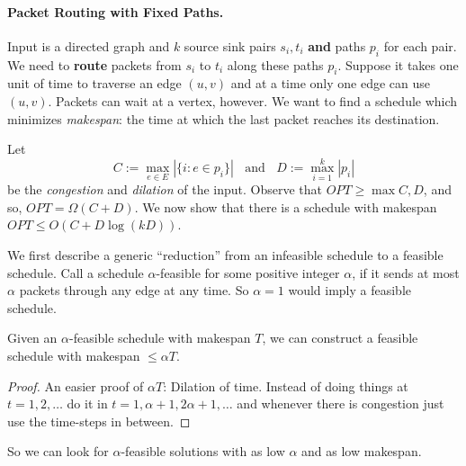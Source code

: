 \documentclass[11pt]{article}
\begin{document}
	\paragraph{Packet Routing with Fixed Paths.} 
	
	Input is a directed graph and $k$ source sink pairs $s_i,t_i$ {\bf and} paths $p_i$ for each pair. 
	We need to {\bf route} packets from $s_i$ to $t_i$ along these paths $p_i$. Suppose it takes one unit of time to traverse an edge $(u,v)$ and at a time only one edge can use $(u,v)$.
	Packets can wait at a vertex, however.
	We want to find a schedule which minimizes {\em makespan}: the time at which the last packet reaches its destination.
	
	Let 
	\[
	C := \max_{e\in E} |\{i: e\in p_i\}|~~~~ \textrm{and}~~~~ D := \max_{i=1}^k |p_i|
	\]
	be the {\em congestion} and {\em dilation} of the input. Observe that $OPT \geq \max{C,D}$, and so, $OPT = \Omega(C+D)$.
	We now show that there is a schedule with makespan $OPT \leq O(C + D\log(kD))$.
	
	
	We first describe a generic ``reduction'' from an infeasible schedule to a feasible schedule. 
	Call a schedule $\alpha$-feasible for some positive integer $\alpha$, if it sends
	at most $\alpha$ packets through any edge at any time. So $\alpha = 1$ would imply a feasible schedule. 
	\begin{lemma}
		Given an $\alpha$-feasible schedule with makespan $T$, we can construct a feasible schedule with makespan $\leq \alpha T$. %
	\end{lemma}
	\begin{proof}
		An easier proof of $\alpha T$: Dilation of time. Instead of doing things at $t = 1,2,\ldots$ do it in $t=1,\alpha+1,2\alpha+1,\ldots$ and whenever
		there is congestion just use the time-steps in between.
	\end{proof}
	\noindent	
	So we can look for $\alpha$-feasible solutions with as low $\alpha$ and as low makespan. 
	
\end{document}
